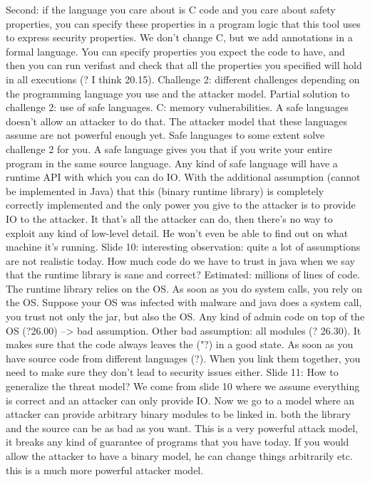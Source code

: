 \documentclass[10pt,a4paper]{report}
\begin{document}
Second: if the language you care about is C code and you care about safety properties, you can specify these properties in a program logic that this tool uses to express security properties. We don't change C, but we add annotations in a formal language. You can specify properties you expect the code to have, and then you can run verifast and check that all the properties you specified will hold in all executions (? I think 20.15). 
Challenge 2: different challenges depending on the programming language you use and the attacker model. Partial solution to challenge 2: use of safe languages. C: memory vulnerabilities. A safe languages doesn't allow an attacker to do that. The attacker model that these languages assume are not powerful enough yet. 
Safe languages to some extent solve challenge 2 for you. A safe language gives you that if you write your entire program in the same source language. Any kind of safe language will have a runtime API with which you can do IO. With the additional assumption (cannot be implemented in Java) that this (binary runtime library) is completely correctly implemented and the only power you give to the attacker is to provide IO to the attacker. It that's all the attacker can do, then there's no way to exploit any kind of low-level detail. He won't even be able to find out on what machine it's running. 
Slide 10: interesting observation: quite a lot of assumptions are not realistic today.
How much code do we have to trust in java when we say that the runtime library is sane and correct? Estimated: millions of lines of code. The runtime library relies on the OS. As soon as you do system calls, you rely on the OS. Suppose your OS was infected with malware and java does a system call, you trust not only the jar, but also the OS. Any kind of admin code on top of the OS (?26.00) --> bad assumption.
Other bad assumption: all modules (? 26.30). It makes sure that the code always leaves the ("?) in a good state.
As soon as you have source code from different languages (?). When you link them together, you need to make sure they don't lead to security issues either.
Slide 11: How to generalize the threat model?  We come from slide 10 where we assume everything is correct and an attacker can only provide IO. Now we go to a model where an attacker can provide arbitrary binary modules to be linked in. both the library and the source can be as bad as you want. This is a very powerful attack model, it breaks any kind of guarantee of programs that you have today. If you would allow the attacker to have a binary model, he can change things arbitrarily etc. this is a much more powerful attacker model.
\end{document}
